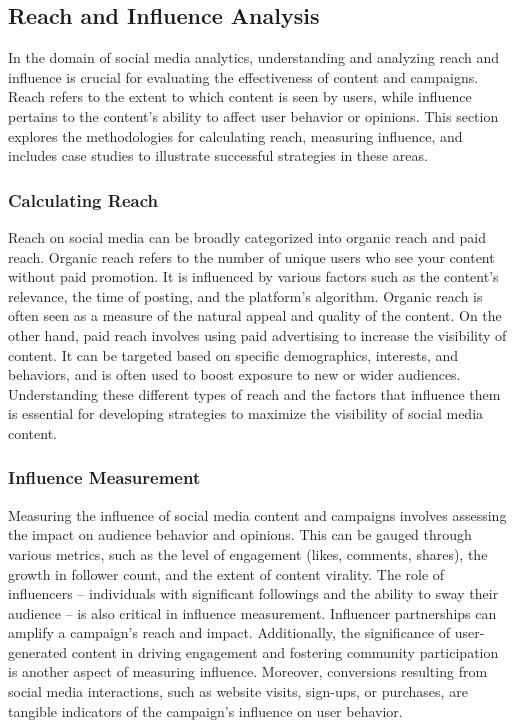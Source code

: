 \documentclass[
]{book}
\begin{document}
\hypertarget{reach-and-influence-analysis}{%
\subsection*{Reach and Influence Analysis}\label{reach-and-influence-analysis}}

In the domain of social media analytics, understanding and analyzing reach and influence is crucial for evaluating the effectiveness of content and campaigns. Reach refers to the extent to which content is seen by users, while influence pertains to the content's ability to affect user behavior or opinions. This section explores the methodologies for calculating reach, measuring influence, and includes case studies to illustrate successful strategies in these areas.

\hypertarget{calculating-reach}{%
\subsubsection*{Calculating Reach}\label{calculating-reach}}

Reach on social media can be broadly categorized into organic reach and paid reach. Organic reach refers to the number of unique users who see your content without paid promotion. It is influenced by various factors such as the content's relevance, the time of posting, and the platform's algorithm. Organic reach is often seen as a measure of the natural appeal and quality of the content. On the other hand, paid reach involves using paid advertising to increase the visibility of content. It can be targeted based on specific demographics, interests, and behaviors, and is often used to boost exposure to new or wider audiences. Understanding these different types of reach and the factors that influence them is essential for developing strategies to maximize the visibility of social media content.

\hypertarget{influence-measurement}{%
\subsubsection*{Influence Measurement}\label{influence-measurement}}

Measuring the influence of social media content and campaigns involves assessing the impact on audience behavior and opinions. This can be gauged through various metrics, such as the level of engagement (likes, comments, shares), the growth in follower count, and the extent of content virality. The role of influencers -- individuals with significant followings and the ability to sway their audience -- is also critical in influence measurement. Influencer partnerships can amplify a campaign's reach and impact. Additionally, the significance of user-generated content in driving engagement and fostering community participation is another aspect of measuring influence. Moreover, conversions resulting from social media interactions, such as website visits, sign-ups, or purchases, are tangible indicators of the campaign's influence on user behavior.
\end{document}

